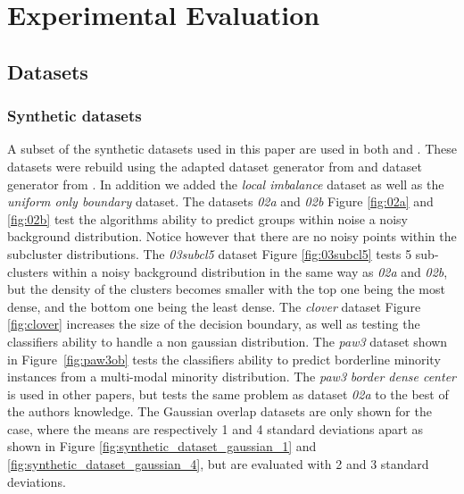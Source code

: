 \section{Experimental Evaluation}
\subsection{Datasets}
\subsubsection{Synthetic datasets}
A subset of the synthetic datasets used in this paper are used in both \cite{DBLP:conf/ida/MercierSASSS18} and \cite{santos2022joint}. These datasets were rebuild using the adapted dataset generator from \cite{santos2022joint} and dataset generator from \cite{DSPipe}. In addition we added the \emph{local imbalance} dataset as well as the \emph{uniform only boundary} dataset. The datasets \emph{02a} and \emph{02b} Figure \ref{fig:02a} and \ref{fig:02b} test the algorithms ability to predict groups within noise a noisy background distribution. Notice however that there are no noisy points within the subcluster distributions. The \emph{03subcl5} dataset Figure \ref{fig:03subcl5} tests 5 sub-clusters within a noisy background distribution in the same way as \emph{02a} and \emph{02b}, but the density of the clusters becomes smaller with the top one being the most dense, and the bottom one being the least dense. The \emph{clover} dataset Figure \ref{fig:clover} increases the size of the decision boundary, as well as testing the classifiers ability to handle a non gaussian distribution. The \emph{paw3} dataset shown in Figure~\ref{fig:paw3ob} tests the classifiers ability to predict borderline minority instances from a multi-modal minority distribution. The \emph{paw3} \emph{border dense center} is used in other papers, but tests the same problem as dataset \emph{02a} to the best of the authors knowledge.
The Gaussian overlap datasets are only shown for the case, where the means are respectively 1 and 4 standard deviations apart as shown in Figure \ref{fig:synthetic_dataset_gaussian_1} and \ref{fig:synthetic_dataset_gaussian_4}, but are evaluated with 2 and 3 standard deviations. 
